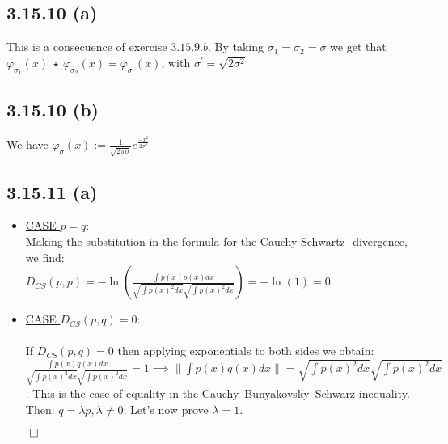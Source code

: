 \documentclass{exam}
\renewenvironment{proof}{{\noindent\itshape\ignorespaces}}{{\hfill$\qed$\\}}
\begin{document}
\subsection*{3.15.10 (a)}
This is a consecuence of exercise $3.15.9.b$. By taking $\sigma_1 = \sigma_2 = \sigma$ we get that $\varphi_{\sigma_1}(x) \ \star \ \varphi_{\sigma_2}(x) = \varphi_{\sigma^\prime}(x)$, with $\sigma^\prime = \displaystyle\sqrt{2\sigma^2}$
\subsection*{3.15.10 (b)}
We have $\varphi_{\sigma}(x) := \displaystyle\frac{1}{\sqrt{2\pi\sigma}}e^{\frac{-x^2}{2\sigma^2}}$
\subsection*{3.15.11 (a)}
\begin{proof}  
    \begin{itemize}
        \item \underline{CASE $p=q$}:\newline
        \\
        Making the substitution in the formula for the Cauchy-Schwartz- divergence, we find:\\
        $D_{CS}(p,p) = -\ln(\displaystyle\frac{\int p(x) p(x) d x}{\sqrt{\int p(x)^2 d x } \sqrt{\int p(x)^2 d x }}) = - \ln(1) = 0.$
        \item \underline{CASE $D_{CS}(p,q) = 0$}:\\
        \\
        If $D_{CS}(p,q) = 0$ then applying exponentials to both sides we obtain:\newline
        $\displaystyle\frac{\displaystyle \int p(x) q(x) d x}{\sqrt{\displaystyle\int p(x)^2 d x } \sqrt{\displaystyle\int p(x)^2 d x }} = 1 \implies \lVert \displaystyle\int p(x) q(x) d x \lVert = \sqrt{\displaystyle \int p(x)^2 d x } \sqrt{\displaystyle \int p(x)^2 d x }$. This is the case of equality in
        the Cauchy–Bunyakovsky–Schwarz inequality. Then: $q = \lambda p, \lambda \neq 0$; Let's now prove $\lambda = 1$.\\

    \end{itemize}  
\end{proof}    
\end{document}
